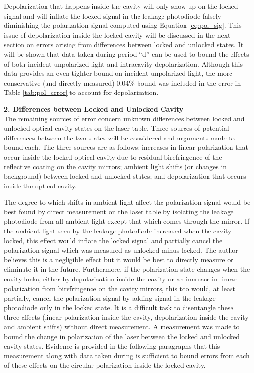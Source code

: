 Depolarization that happens inside the cavity will only show up on the locked signal and will inflate the locked signal in the leakage photodiode falsely diminishing the polarization signal computed using Equation \ref{eq:pol_sig}. This issue of depolarization inside the locked cavity will be discussed in the next section on errors arising from differences between locked and unlocked states. It will be shown that data taken during period ``d''  can be used to bound the effects of both incident unpolarized light and intracavity depolarization. Although this data provides an even tighter bound on incident unpolarized light, the more conservative (and directly measured) 0.04\% bound was included in the error in Table \ref{tab:pol_error} to account for depolarization.

{\bf 2. Differences between Locked and Unlocked Cavity}\\
The remaining sources of error concern unknown differences between locked and unlocked optical cavity states on the laser table. Three sources of potential differences between the two states will be considered and arguments made to bound each. The three sources are as follows: increases in linear polarization that occur inside the locked optical cavity due to residual birefringence of the reflective coating on the cavity mirrors; ambient light shifts (or changes in background) between locked and unlocked states; and depolarization that occurs inside the optical cavity. 

The degree to which shifts in ambient light affect the polarization signal would be best found by direct measurement on the laser table by isolating the leakage photodiode from all ambient light except that which comes through the mirror. If the ambient light seen by the leakage photodiode increased when the cavity locked, this effect would inflate the locked signal and partially cancel the polarization signal which was measured as unlocked minus locked. The author believes this is a negligible effect but it would be best to directly measure or eliminate it in the future. Furthermore, if the polarization state changes when the cavity locks, either by depolarization inside the cavity or an increase in linear polarization from birefringence on the cavity mirrors, this too would, at least partially, cancel the polarization signal by adding signal in the leakage photodiode only in the locked state. It is a difficult task to disentangle these three effects (linear polarization inside the cavity, depolarization inside the cavity and ambient shifts) without direct measurement. A measurement was made to bound the change in polarization of the laser between the locked and unlocked cavity states. Evidence is provided in the following paragraphs that this measurement along with data taken during \Qs is sufficient to bound errors from each of these effects on the circular polarization inside the locked cavity.


